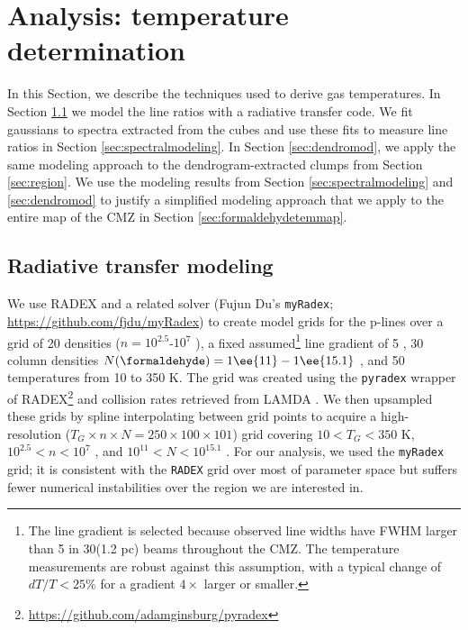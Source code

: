 \section{Analysis: temperature determination}
\label{sec:analysis}
In this Section, we describe the techniques used to derive gas temperatures.
In Section \ref{sec:linemodeling} we model the line ratios with a radiative
transfer code.  We fit gaussians to spectra extracted from the cubes and use
these fits to measure line ratios in Section \ref{sec:spectralmodeling}.  In
Section \ref{sec:dendromod}, we apply the same modeling approach to the
dendrogram-extracted clumps from Section \ref{sec:region}.  We use the modeling
results from Section \ref{sec:spectralmodeling} and \ref{sec:dendromod} to
justify a simplified modeling approach that we apply to the entire map of the
CMZ in Section \ref{sec:formaldehydetemmap}.


\subsection{Radiative transfer modeling}
\label{sec:linemodeling}
We use RADEX \citep{van-Der-Tak2007a} and a related solver (Fujun Du's
\texttt{myRadex}; \url{https://github.com/fjdu/myRadex}) to create model grids
for the p-\formaldehyde lines over a grid of 20 densities ($n=10^{2.5}$-$10^{7}$
\percc), a fixed assumed\footnote{The line gradient is selected because
observed line widths have FWHM larger than 5 \kms in 30\arcsec (1.2 pc) beams
throughout the CMZ.  The temperature measurements are
robust against this assumption, with a typical change of $dT/T < 25\%$ for a
gradient $4\times$ larger or smaller.} line gradient of 5
\perkmspc, 30 \formaldehyde column densities $N(\formaldehyde) =
1\ee{11}-1\ee{15.1}$ \persc, and 50
temperatures from 10 to 350 K.  The grid was created using the \texttt{pyradex}
wrapper of RADEX\footnote{\url{https://github.com/adamginsburg/pyradex}} and
collision rates retrieved from LAMDA \citep{Wiesenfeld2013a}.  We then
upsampled these grids by spline interpolating between grid points to acquire a
high-resolution ($T_G\times n \times N = 250\times100\times101$) grid covering
$10<T_G<350$ K, $10^{2.5} < n < 10^7$ \percc, and $10^{11} < N < 10^{15.1}$
\persc\perkmspc.  For our analysis, we used the \texttt{myRadex} grid; it is
consistent with the \texttt{RADEX} grid over most of parameter space but
suffers fewer numerical instabilities over the region we are interested in.

